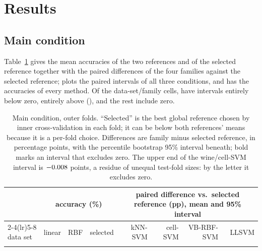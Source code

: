 \documentclass[11pt,a4paper]{article}
\theoremstyle{plain}
\theoremstyle{definition}
\theoremstyle{remark}
\begin{document}
\section{Results}\label{sec:results}

\subsection{Main condition}\label{sec:main}

Table~\ref{tab:main} gives the mean accuracies of the two references and of the selected reference together with the paired differences of the four families against the selected reference;  plots the paired intervals of all three conditions, and  has the accuracies of every method. Of the \NCellsMain{} data-set/family cells, \NNegCellsMain{} have intervals entirely below zero, \NPosCellsMain{} entirely above (\PosCellsMain), and the rest include zero.

\begin{table}[t]
\centering\footnotesize
\setlength{\tabcolsep}{2.5pt}
\begin{tabular}{lrrrrrrr}
\toprule
& \multicolumn{3}{c}{accuracy (\%)} & \multicolumn{4}{c}{paired difference vs.\ selected reference (pp), mean and 95\% interval}\\
\cmidrule(lr){2-4}\cmidrule(lr){5-8}
data set & linear & RBF & selected & kNN-SVM & cell-SVM & VB-RBF-SVM & LLSVM\\
\midrule
\\
\bottomrule
\end{tabular}
\caption{Main condition, \NMainFolds{} outer folds. ``Selected'' is the best global reference chosen by inner cross-validation in each fold; it can be below both references' means because it is a per-fold choice. Differences are family minus selected reference, in percentage points, with the percentile bootstrap 95\% interval beneath; bold marks an interval that excludes zero. The upper end of the wine/cell-SVM interval is $-0.008$ points, a residue of unequal test-fold sizes: by the letter it excludes zero.}
\label{tab:main}
\end{table}
\end{document}

